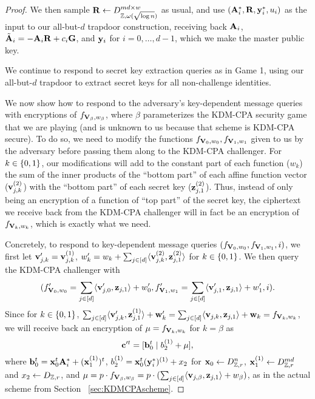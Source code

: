\begin{proof}
  We then sample $\mathbf{R} \gets D_{\mathbb{Z},
    \omega(\sqrt{\log{n}})}^{m{d}\times w}$ as usual, and use
  $(\mathbf{A}_i^*, \mathbf{R}, \mathbf{y}_i^*, u_i)$ as the input to our all-but-$d$
  trapdoor construction, receiving back $\mathbf{A}_i$, $\tilde{\mathbf{A}}_i =
  -\mathbf{A}_i\mathbf{R}+c_i\mathbf{G}$, and $\mathbf{y}_i$ for $i = 0, \ldots, d-1$,
  which we make the master public key.
    
  We continue to respond to secret key extraction queries as in Game
  1, using our all-but-$d$ trapdoor to extract secret keys for all
  non-challenge identities.

  We now show how to respond to the adversary's key-dependent message
  queries with encryptions of $f_{\mathbf{V}_{\beta}, w_{\beta}}$, where
  $\beta$ parameterizes the KDM-CPA security game that we are playing
  (and is unknown to us because that scheme is KDM-CPA secure). To do
  so, we need to modify the functions $f_{\mathbf{V}_{0}, w_0},
  f_{\mathbf{V}_{1}, w_1}$ given to us by the adversary before passing them
  along to the KDM-CPA challenger. For $k \in \{{0,1}\}$, our modifications
  will add to the constant part of each function ($w_{k}$) the sum of
  the inner products of the ``bottom part'' of each affine function
  vector ($\mathbf{v}_{j, k}^{(2)}$) with the ``bottom part'' of each
  secret key ($\mathbf{z}_{j, 1}^{(2)}$). Thus, instead of only being an
  encryption of a function of ``top part'' of the secret key, the
  ciphertext we receive back from the KDM-CPA challenger will in fact
  be an encryption of $f_{\mathbf{V}_{k}, w_{k}}$, which is exactly what we
  need.

  Concretely, to respond to key-dependent message queries
  $(f_{\mathbf{V}_0, w_0}, f_{\mathbf{V}_1, w_1}, i)$, we first
  let $\mathbf{v}'_{j, k} = \mathbf{v}_{j,k}^{(1)}$, $w'_{k} = w_{k}+\sum_{j \in
    [d]}\langle{\ensuremath{\mathbf{v}}_{j,k}^{(2)}, \ensuremath{\mathbf{z}}_{j,1}^{(2)}}\rangle$ for $k \in
  \{{0,1}\}$.  We then query the KDM-CPA challenger with \[(f'_ {\mathbf{V}_{0},
    w_0} = \sum_{j \in [d]}\langle{\ensuremath{\mathbf{v}}'_{j, 0}, \ensuremath{\mathbf{z}}_{j,1}}\rangle + w'_0,
  f'_{\mathbf{V}_1, w_1} = \sum_{j \in [d]}\langle{\ensuremath{\mathbf{v}}'_{j, 1},
    \ensuremath{\mathbf{z}}_{j,1}}\rangle + w'_1, i).\]  
    Since for $k \in \{{0,1}\}$, $\sum_{j \in [d]}\langle{\ensuremath{\mathbf{v}}'_{j, k}, \ensuremath{\mathbf{z}}_{j,1}^{(1)}}\rangle
    +\mathbf{w}_{k}' = \sum_{j\in [d]}\langle{\ensuremath{\mathbf{v}}_{j,k}, \ensuremath{\mathbf{z}}_{j,1}}\rangle + \mathbf{w}_{k} =
  f_{\mathbf{V}_{k}, w_{k}}$, we will receive back an encryption of
  $\mu=f_{\mathbf{V}_{k}, w_{k}}$ for $k=\beta$ as
  \[\mathbf{c}'^t = [\mathbf{b}_0^t \mid b_2^{(1)} + \mu],\]
  where $\mathbf{b}_0^t = \mathbf{x}_0^t\mathbf{A}_i^{*}+(\mathbf{x}_1^{(1)})^t$,
  $b_2^{(1)}=\mathbf{x}_0^t(\mathbf{y}_i^{*})^{(1)}+x_2$ for $\mathbf{x}_0 \gets D_{\mathbb{Z},
    r}^{n}$, $\mathbf{x}_1^{(1)} \gets D_{\mathbb{Z}, r}^{md}$ and $x_2 \gets D_{\mathbb{Z}, r}$,
  and $\mu = p \cdot f_{\mathbf{V}_{\beta}, w_{\beta}} = p \cdot 
  (\sum_{j \in [d]}\langle{\ensuremath{\mathbf{v}}_{j, \beta},
    \ensuremath{\mathbf{z}}_{j,1}}\rangle + w_{\beta})$, as in the actual scheme from
  Section ~\ref{sec:KDMCPAscheme}.


\end{proof}

